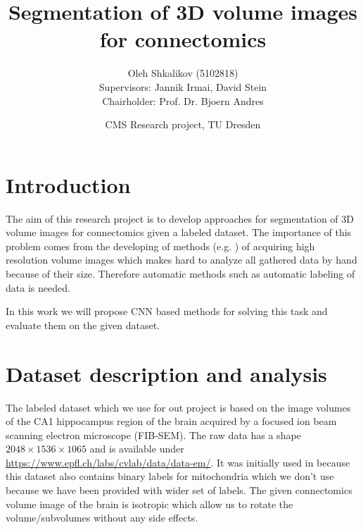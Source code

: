 \documentclass[twocolumn, a4paper]{article}
\theoremstyle{definition}
\begin{document}
\title{\bf\Large Segmentation of 3D volume images for connectomics}
\author{Oleh Shkalikov\texorpdfstring{ (5102818)
\\[0.7em]{\small Supervisors: Jannik Irmai, David Stein}
\\{\small Chairholder: Prof. Dr. Bjoern Andres}}{}}
\date{CMS Research project, TU Dresden}

\twocolumn[
    \begin{@twocolumnfalse}
        \maketitle

        \vspace{7ex}
    \end{@twocolumnfalse}
]

\section{Introduction}
The aim of this research project is to develop approaches
for segmentation of 3D volume images for connectomics given
a labeled dataset. The importance of this problem comes from the
developing of methods (e.g. \cite{10.7554/eLife.25916}) of acquiring high resolution volume images
which makes hard to analyze all gathered data by hand because of their size.
Therefore automatic methods such as automatic labeling of data is needed.

In this work we will propose CNN based methods for solving this task and evaluate them
on the given dataset.

\section{Dataset description and analysis} \label{sec:data_analysis}

The labeled dataset which we use for out project is based on
the image volumes of the CA1 hippocampus region of the brain
acquired by a focused ion beam scanning electron microscope (FIB-SEM).
The raw data has a shape \( 2048 \times 1536 \times 1065 \)  and is available under
\url{https://www.epfl.ch/labs/cvlab/data/data-em/}. It was initially used in
\cite{lucchi2011supervoxel,lucchi2013learning} because this dataset also contains binary
labels for mitochondria which we don't use because we have been provided with wider
set of labels. The given connectomics volume image of the brain is
isotropic which allow us to rotate the volume/subvolumes without any side effects.
\end{document}
